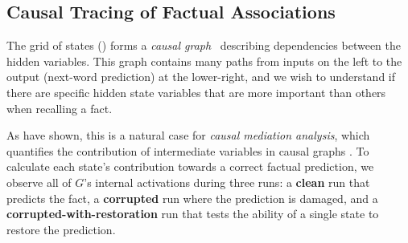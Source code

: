

\subsection{Causal Tracing of Factual Associations} \label{subsec:cma}

The grid of states ()
forms a %
\emph{causal graph}~\citep{pearl2009} describing dependencies between the hidden variables.  This graph contains many paths from inputs on the left to the output (next-word prediction) at the lower-right, and we wish to understand if there are specific hidden state variables that are more important than others when recalling a fact.

As \citet{vig2020investigating} have shown, this is a natural case for \textit{causal mediation analysis}, which quantifies the contribution of intermediate variables in causal graphs \citep{pearl2001direct}. To calculate each state's contribution towards a correct factual prediction, we observe all of $G$'s internal activations during three runs: a \textbf{clean} run that predicts the fact, a \textbf{corrupted} run where the prediction is damaged, and a \textbf{corrupted-with-restoration} run that tests the ability of a single state to restore the prediction.


